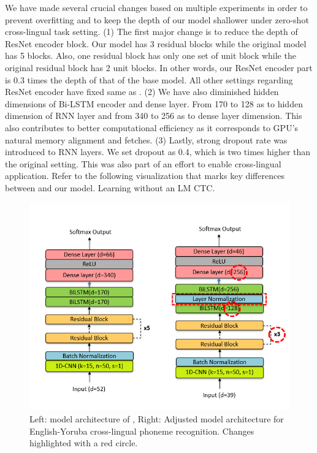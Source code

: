 \documentclass[11pt]{article}
\begin{document}
{We have made several crucial changes based on multiple experiments in order to prevent overfitting and to keep the depth of our model shallower under zero-shot cross-lingual task setting. (1) The first major change is to reduce the depth of ResNet encoder block. Our model has 3 residual blocks while the original model has 5 blocks. Also, one residual block has only one set of unit block while the original residual block has 2 unit blocks. In other words, our ResNet encoder part is 0.3 times the depth of that of the base model. All other settings regarding ResNet encoder have fixed same as \cite{dhakal2022automatic}. (2) We have also diminished hidden dimensions of Bi-LSTM encoder and dense layer. From 170 to 128 as to hidden dimension of RNN layer and from 340 to 256 as to dense layer dimension. This also contributes to better computational efficiency as it corresponds to GPU's natural memory alignment and fetches. (3) Lastly, strong dropout rate was introduced to RNN layers. We set dropout as 0.4, which is two times higher than the original setting. This was also part of an effort to enable cross-lingual application. Refer to the following visualization that marks key differences between \cite{dhakal2022automatic} and our model.
Learning without an LM CTC.
\begin{figure}
    \centering
    \includegraphics[width=1\linewidth]{modelarchitecture+.png}
    \caption{Left: model architecture of \cite{dhakal2022automatic} , Right: Adjusted model architecture for English-Yoruba cross-lingual phoneme recognition. Changes highlighted with a red circle.}
    \label{fig:architecture}
\end{figure}


}
\end{document}
